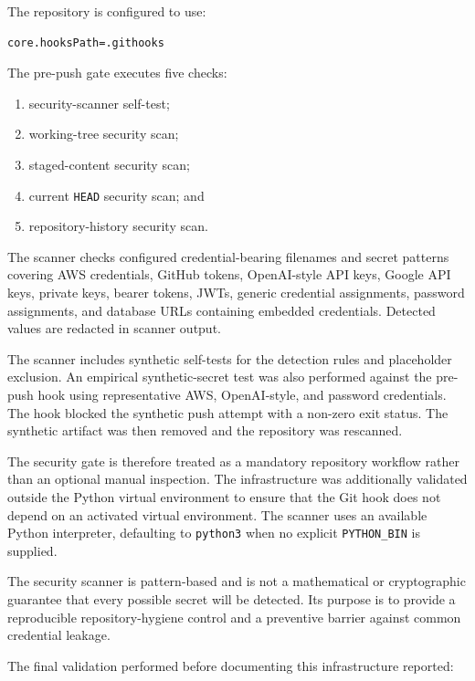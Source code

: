 \documentclass[11pt,a4paper]{article}
\begin{document}
The repository is configured to use:

\begin{verbatim}
core.hooksPath=.githooks
\end{verbatim}

The pre-push gate executes five checks:

\begin{enumerate}
    \item security-scanner self-test;
    \item working-tree security scan;
    \item staged-content security scan;
    \item current \texttt{HEAD} security scan; and
    \item repository-history security scan.
\end{enumerate}

The scanner checks configured credential-bearing filenames and secret
patterns covering AWS credentials, GitHub tokens, OpenAI-style API keys,
Google API keys, private keys, bearer tokens, JWTs, generic credential
assignments, password assignments, and database URLs containing embedded
credentials. Detected values are redacted in scanner output.

The scanner includes synthetic self-tests for the detection rules and
placeholder exclusion. An empirical synthetic-secret test was also
performed against the pre-push hook using representative AWS,
OpenAI-style, and password credentials. The hook blocked the synthetic
push attempt with a non-zero exit status. The synthetic artifact was then
removed and the repository was rescanned.

The security gate is therefore treated as a mandatory repository
workflow rather than an optional manual inspection. The infrastructure
was additionally validated outside the Python virtual environment to
ensure that the Git hook does not depend on an activated virtual
environment. The scanner uses an available Python interpreter, defaulting
to \texttt{python3} when no explicit \texttt{PYTHON\_BIN} is supplied.

The security scanner is pattern-based and is not a mathematical or
cryptographic guarantee that every possible secret will be detected.
Its purpose is to provide a reproducible repository-hygiene control and
a preventive barrier against common credential leakage.

The final validation performed before documenting this infrastructure
reported:
\end{document}

